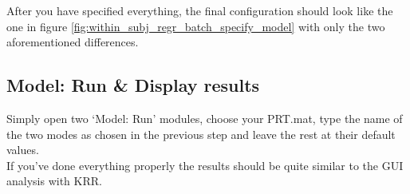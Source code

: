 \noindent After you have specified everything, the final configuration should look like the one in figure \ref{fig:within_subj_regr_batch_specify_model} with only the two aforementioned differences.


\subsection{Model: Run \& Display results}

Simply open two `Model: Run' modules, choose your PRT.mat, type the name of the two modes as chosen in the previous step and leave the rest at their default values.
\\

\noindent If you've done everything properly the results should be quite similar to the GUI analysis with KRR.






